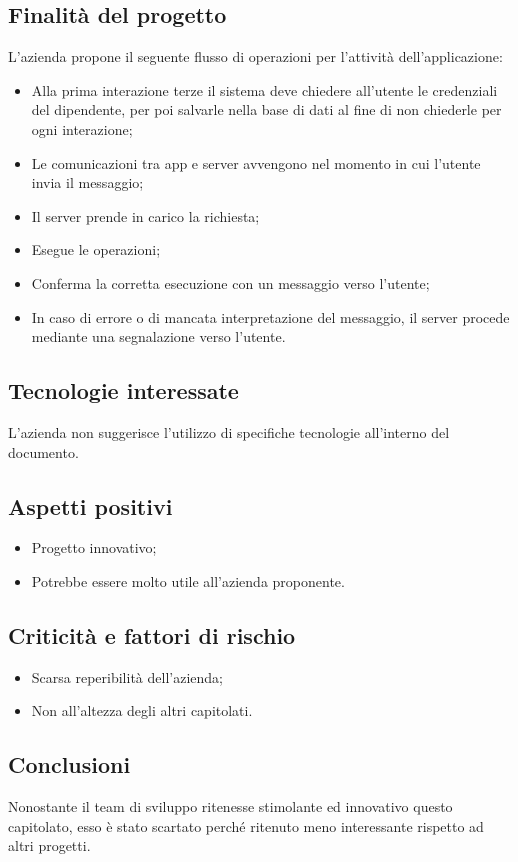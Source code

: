 	\subsection{Finalità del progetto}
		L'azienda propone il seguente flusso di operazioni per l'attività dell'applicazione:
		\begin {itemize}
			\item Alla prima interazione terze il sistema deve chiedere all'utente le credenziali del dipendente, per poi salvarle nella base di dati al fine di non chiederle per ogni interazione;
			\item Le comunicazioni tra app e server avvengono nel momento in cui l'utente invia il messaggio;
			\item Il server prende in carico la richiesta;
			\item Esegue le operazioni;
			\item Conferma la corretta esecuzione con un messaggio verso l'utente;
			\item In caso di errore o di mancata interpretazione del messaggio, il server procede mediante una segnalazione verso l'utente.
		\end {itemize}

	\subsection {Tecnologie interessate}
		L'azienda non suggerisce l'utilizzo di specifiche tecnologie all'interno del documento.

	\subsection{Aspetti positivi}
		\begin{itemize}
			\item Progetto innovativo;
			\item Potrebbe essere molto utile all'azienda proponente.
		\end{itemize}
	\subsection {Criticità e fattori di rischio}
		\begin{itemize}
			\item Scarsa reperibilità dell'azienda;
			\item Non all'altezza degli altri capitolati.
	\end{itemize}
\subsection {Conclusioni}
Nonostante il team di sviluppo ritenesse stimolante ed innovativo questo capitolato, esso è stato scartato perché ritenuto meno interessante rispetto ad altri progetti.
